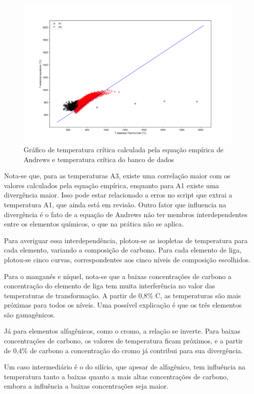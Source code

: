 \documentclass[brazil,tese,epusp]{usp}
\begin{document}
\begin{figure}
  \includegraphics[width=1.1\textwidth]{img/andrews.png}
  \caption{Gráfico de temperatura crítica calculada pela equação empírica de Andrews e temperatura crítica do banco de dados}
  \label{fig:tcrit_andrews}
\end{figure}

Nota-se que, para as temperaturas A3, existe uma correlação maior com os valores calculados pela equação empírica, enquanto para A1 existe uma divergência maior. Isso pode estar relacionado a erros no script que extrai a temperatura A1, que ainda está em revisão. Outro fator que influencia na divergência é o fato de a equação de Andrews não ter membros interdependentes entre os elementos químicos, o que na prática não se aplica.

Para averiguar essa interdependência, plotou-se as isopletas de temperatura para cada elemento, variando a composição de carbono. Para cada elemento de liga, plotou-se cinco curvas, correspondentes aos cinco níveis de composição escolhidos.

Para o manganês e níquel, nota-se que a baixas concentrações de carbono a concentração do elemento de liga tem muita interferência no valor das temperaturas de transformação. A partir de 0,8\% C, as temperaturas são mais próximas para todos os níveis. Uma possível explicação é que os três elementos são gamagênicos.

Já para elementos alfagênicos, como o cromo, a relação se inverte. Para baixas concentrações de carbono, os valores de temperatura ficam próximos, e a partir de 0,4\% de carbono a concentração do cromo já contribui para sua divergência.

Um caso intermediário é o do silício, que apesar de alfagênico, tem influência na temperatura tanto a baixas quanto a mais altas concentrações de carbono, embora a influência a baixas concentrações seja maior.
\end{document}
